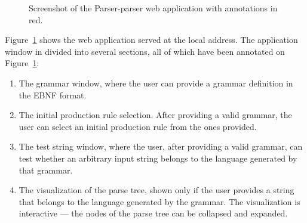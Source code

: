\documentclass[english,bachelors,forcepolishlogotype]{wizthesis}
\newcommand{\thisproject}{Parser-parser}
\begin{document}
\begin{figure}[ht]
  \centering
  \caption{Screenshot of the \thisproject{} web application with annotations in
  red.}
  \label{fig:parser-parser-screenshot}
\end{figure}

Figure~\ref{fig:parser-parser-screenshot} shows the web application served at
the local address. The application window in divided into several sections,
all of which have been annotated on Figure~\ref{fig:parser-parser-screenshot}:
\begin{enumerate}
  \item The grammar window, where the user can provide a grammar definition
  in the EBNF format.
  \item The initial production rule selection. After providing a valid grammar,
  the user can select an initial production rule from the ones provided.
  \item The test string window, where the user, after providing a valid grammar,
  can test whether an arbitrary input string belongs to the language generated
  by that grammar.
  \item The visualization of the parse tree, shown only if the user provides a
  string that belongs to the language generated by the grammar. The
  visualization is interactive --- the nodes of the parse tree can be collapsed
  and expanded.
\end{enumerate}
\end{document}
